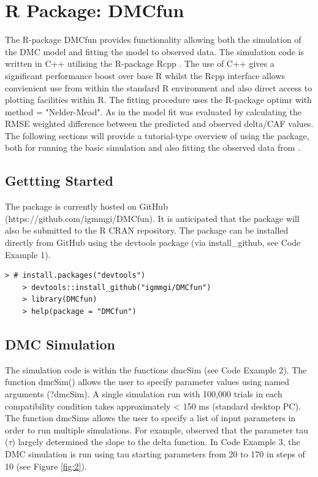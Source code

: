 \section{R Package: DMCfun} 
The R-package DMCfun provides functionality allowing both the simulation of the
DMC model and fitting the model to observed data. The simulation code is
written in C++ utilising the R-package Rcpp \parencite{eddelbuettel2011rcpp}.
The use of C++ gives a significant performance boost over base R whilst the
Rcpp interface allows convienient use from within the standard R environment
and also direct access to plotting facilities within R. The fitting procedure
uses the R-package optimr \textcite{optimr} with method = "Nelder-Mead". As in
\textcite{ulrich2015automatic} the model fit was evaluated by calculating the
RMSE weighted difference between the predicted and observed delta/CAF values.
The following sections will provide a tutorial-type overview of using the
package, both for running the basic simulation and also fitting the observed
data from \textcite{ulrich2015automatic}.

\label{dmc_fun}
\subsection{Gettting Started}
\label{getting_started}
The package is currently hosted on GitHub (https://github.com/igmmgi/DMCfun).
It is anticipated that the package will also be submitted to the R CRAN
repository. The package can be installed directly from GitHub using the
devtools package (via install\_github, see Code Example 1).

\begin{minipage}{\linewidth}
    \begin{lstlisting}[style = R, title={R Code Example 1: instalation}, captionpos=t]
    > # install.packages("devtools")
    > devtools::install_github("igmmgi/DMCfun")
    > library(DMCfun)
    > help(package = "DMCfun")  
    \end{lstlisting}
\end{minipage}

\subsection{DMC Simulation}
\label{dmc_simulation}
The simulation code is within the functions dmcSim (see Code Example 2).  The
function dmcSim() allows the user to specify parameter values using named
arguments (?dmcSim). A single simulation run with 100,000 trials in each
compatibility condition takes approximately < 150 ms (standard desktop PC).
The function dmcSims allows the user to specify a list of input parameters in
order to run multiple simulations. For example, \textcite{ulrich2015automatic}
observed that the parameter tau ($\tau$) largely determined the slope to the
delta function. In Code Example 3, the DMC simulation is run using tau starting
parameters from 20 to 170 in steps of 10 (see Figure \ref{fig:2}).

